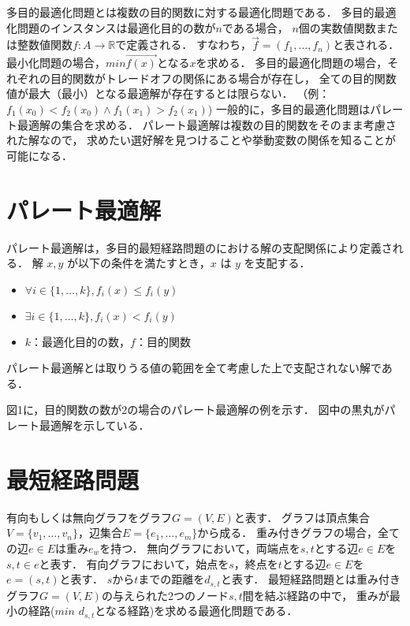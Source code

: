 \documentclass[12pt]{optlab-bachelor}
\begin{document}
多目的最適化問題とは複数の目的関数に対する最適化問題である．
多目的最適化問題のインスタンスは最適化目的の数が$n$である場合，
$n$個の実数値関数または整数値関数$f : A \rightarrow \mathbb{R}$で定義される．
すなわち，$\vec{f} = (f_1 , \ldots , f_n)$と表される．
最小化問題の場合，$min\vec{f(x)}$となる$x$を求める．
多目的最適化問題の場合，それぞれの目的関数がトレードオフの関係にある場合が存在し，
全ての目的関数値が最大（最小）となる最適解が存在するとは限らない．
（例：$f_1(x_0) < f_2(x_0) \land f_1(x_1) > f_2(x_1)$)
一般的に，多目的最適化問題はパレート最適解の集合を求める．
パレート最適解は複数の目的関数をそのまま考慮された解なので，
求めたい選好解を見つけることや挙動変数の関係を知ることが可能になる．

\section{パレート最適解}
パレート最適解は，多目的最短経路問題のにおける解の支配関係により定義される．
解 $x,y$ が以下の条件を満たすとき，$x$ は $y$ を支配する．
\begin{itemize}
\item $\forall i \in \{1,\ldots,k\},f_i(x) \le f_i(y)$
\item $\exists i \in \{1,\ldots,k\},f_i(x) < f_i(y)$
\item $k$：最適化目的の数，$f$：目的関数
\end{itemize}
パレート最適解とは取りうる値の範囲を全て考慮した上で支配されない解である．

図1に，目的関数の数が2の場合のパレート最適解の例を示す．
図中の黒丸がパレート最適解を示している．

\section{最短経路問題}
有向もしくは無向グラフをグラフ$G=(V,E)$と表す．
グラフは頂点集合$V=\{v_1,\ldots,v_n\}$，辺集合$E=\{e_1,\ldots,e_m\}$から成る．
重み付きグラフの場合，全ての辺$e\in E$は重み$e_w$を持つ．
無向グラフにおいて，両端点を$s,t$とする辺$e \in E$を$s,t \in e$と表す．
有向グラフにおいて，始点を$s$，終点を$t$とする辺$e \in E$を$e=(s,t)$と表す．
$s$から$t$までの距離を$d_{s,t}$と表す．
最短経路問題とは重み付きグラフ$G=(V,E)$の与えられた2つのノード$s,t$間を結ぶ経路の中で，
重みが最小の経路($min$ $d_{s,t}$となる経路)を求める最適化問題である．
\end{document}
